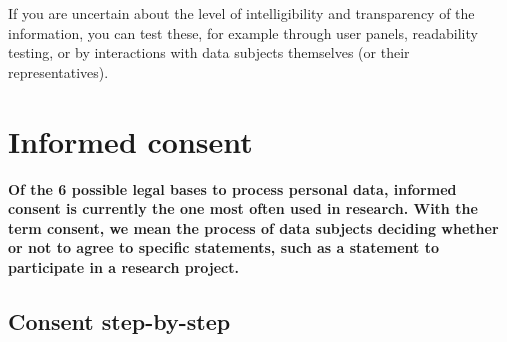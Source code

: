 \documentclass[
]{book}
\begin{document}
If you are uncertain about the level of intelligibility and transparency of the
information, you can test these, for example through user panels, readability
testing, or by interactions with data subjects themselves (or their
representatives).

\hypertarget{informed-consent-forms}{%
\section{Informed consent}\label{informed-consent-forms}}

\textbf{Of the 6 possible legal bases to process personal data, informed consent is
currently the one most often used in research. With the term consent, we mean
the process of data subjects deciding whether or not to agree to specific
statements, such as a statement to participate in a research project.}

\hypertarget{consent-step-by-step}{%
\subsection{Consent step-by-step}\label{consent-step-by-step}}
\end{document}

